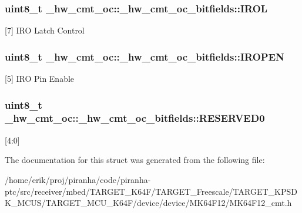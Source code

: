 \subsubsection[{\texorpdfstring{I\+R\+OL}{IROL}}]{\setlength{\rightskip}{0pt plus 5cm}uint8\+\_\+t \+\_\+hw\+\_\+cmt\+\_\+oc\+::\+\_\+hw\+\_\+cmt\+\_\+oc\+\_\+bitfields\+::\+I\+R\+OL}\hypertarget{struct__hw__cmt__oc_1_1__hw__cmt__oc__bitfields_a7c8f9edca6a8700dbb4d48b572400939}{}\label{struct__hw__cmt__oc_1_1__hw__cmt__oc__bitfields_a7c8f9edca6a8700dbb4d48b572400939}
\mbox{[}7\mbox{]} I\+RO Latch Control 
\subsubsection[{\texorpdfstring{I\+R\+O\+P\+EN}{IROPEN}}]{\setlength{\rightskip}{0pt plus 5cm}uint8\+\_\+t \+\_\+hw\+\_\+cmt\+\_\+oc\+::\+\_\+hw\+\_\+cmt\+\_\+oc\+\_\+bitfields\+::\+I\+R\+O\+P\+EN}\hypertarget{struct__hw__cmt__oc_1_1__hw__cmt__oc__bitfields_a77f6c985c653dad5faba1b75527c1d01}{}\label{struct__hw__cmt__oc_1_1__hw__cmt__oc__bitfields_a77f6c985c653dad5faba1b75527c1d01}
\mbox{[}5\mbox{]} I\+RO Pin Enable 
\subsubsection[{\texorpdfstring{R\+E\+S\+E\+R\+V\+E\+D0}{RESERVED0}}]{\setlength{\rightskip}{0pt plus 5cm}uint8\+\_\+t \+\_\+hw\+\_\+cmt\+\_\+oc\+::\+\_\+hw\+\_\+cmt\+\_\+oc\+\_\+bitfields\+::\+R\+E\+S\+E\+R\+V\+E\+D0}\hypertarget{struct__hw__cmt__oc_1_1__hw__cmt__oc__bitfields_af44f921c9cf80708fe73a6dda8bc950e}{}\label{struct__hw__cmt__oc_1_1__hw__cmt__oc__bitfields_af44f921c9cf80708fe73a6dda8bc950e}
\mbox{[}4\+:0\mbox{]} 

The documentation for this struct was generated from the following file\+:\begin{DoxyCompactItemize}
\item 
/home/erik/proj/piranha/code/piranha-\/ptc/src/receiver/mbed/\+T\+A\+R\+G\+E\+T\+\_\+\+K64\+F/\+T\+A\+R\+G\+E\+T\+\_\+\+Freescale/\+T\+A\+R\+G\+E\+T\+\_\+\+K\+P\+S\+D\+K\+\_\+\+M\+C\+U\+S/\+T\+A\+R\+G\+E\+T\+\_\+\+M\+C\+U\+\_\+\+K64\+F/device/device/\+M\+K64\+F12/M\+K64\+F12\+\_\+cmt.\+h\end{DoxyCompactItemize}
